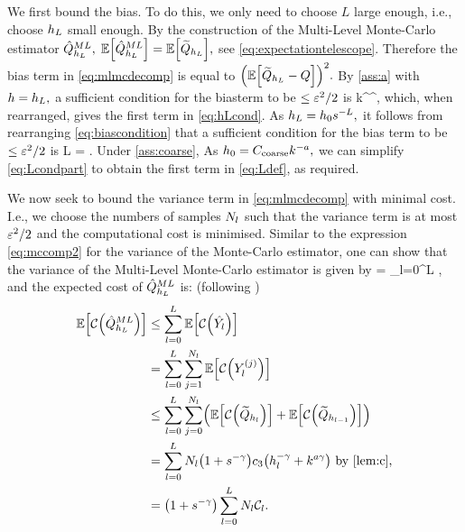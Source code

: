We first bound the bias. To do this, we only need to choose $L$ large enough, i.e., choose $h_{L}$ small enough. By the construction of the Multi-Level Monte-Carlo estimator $\hat{Q}^{ML}_{h_{L}},$ $\EXP{\QhatMLhL} = \EXP{\QhLtilde},$ see \cref{eq:expectationtelescope}. Therefore the bias term in \cref{eq:mlmcdecomp} is equal to $\mleft(\EXP{\QhLtilde - Q}\mright)^2.$ By \cref{ass:a} with $h=h_{L},$ a sufficient condition for the biasterm to be $\leq \varepsilon^2/2$ is
\beq\label{eq:biascondition}
\co k^\sigma \hL^\alpha \leq {},
\eeq
which, when rearranged, gives the first term in \eqref{eq:hLcond}. As $h_{L} = h_{0} s^{-L},$ it follows from rearranging \cref{eq:biascondition} that a sufficient condition for the bias term to be $\leq \varepsilon^2/2$ is
\beq\label{eq:Lcondpart}
L = .
\eeq
Under \cref{ass:coarse}, As $h_{0} = C_{\mathrm{coarse}} k^{-a},$ we can simplify \eqref{eq:Lcondpart} to obtain the first term in \eqref{eq:Ldef}, as required.

We now seek to bound the variance term in \cref{eq:mlmcdecomp} with minimal cost. I.e., we choose the numbers of samples $N_{l}$ such that the variance term is at most $\varepsilon^2/2$ and the computational cost is minimised. Similar to the expression \cref{eq:mccomp2} for the variance of the Monte-Carlo estimator, one can show that the variance of the Multi-Level Monte-Carlo estimator is given by
\beq\label{eq:mlmcvariance}
\VAR{\QhatMLhL} = \sum_{l=0}^L \frac{\Vl}{\Nl},
\eeq
and the expected cost of $\hat{Q}^{ML}_{h_{L}}$ is: (following \cite{GrPaSc:19})
\begin{align}
\EXP{\Cost{\QhatMLhL}}&\leq \sum_{l=0}^L \EXP{\Cost{\Ylhat}}\nonumber\\
&= \sum_{l=0}^L \sum_{j=1}^{\Nl} \EXP{\Cost{\Ylj}}\nonumber\\
&\leq \sum_{l=0}^L \sum_{j=0}^{\Nl} \mleft(\EXP{\Cost{\Qhltilde}} + \EXP{\Cost{\Qhlmotilde}}\mright)\nonumber\\
&=\sum_{l=0}^L \Nl\mleft(1+s^{-\gamma}\mright) \cth \mleft(\hl^{-\gamma}+k^{a\gamma}\mright) \text{ by \cref{lem:c},}\nonumber\\
&= \mleft(1+s^{-\gamma}\mright) \sum_{l=0}^L \Nl\Cl.\label{eq:Cboundformin}
\end{align}

